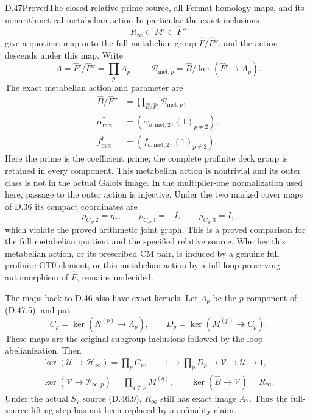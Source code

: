 \begin{statement}{D.47}{Proved}{The closed relative-prime source, all Fermat homology maps, and its nonarithmetical metabelian action}
In particular the exact inclusions
\[
                    R_\infty\subset M'
                                     \subset\widehat F''      \tag{D.47.9}
\]
give a quotient map onto the full metabelian group
\(\widehat F/\widehat F''\), and the action descends
under this map. Write
\[
 A=\widehat F'/\widehat F''=\prod_pA_p,\qquad
 \mathcal B_{\mathrm{met},p}
       =\widehat B/\ker(\widehat F'\to A_p).
\]
The exact metabelian action and parameter are
\[
 \begin{aligned}
 \widehat B/\widehat F''
       &=\prod_{\widehat B/\widehat F'}
                                      \mathcal B_{\mathrm{met},p},\\
 \alpha_{\mathrm{met}}^\dagger
       &=(\alpha_{h,\mathrm{met},2},
                                (1)_{p\ne2}),\\
 f_{\mathrm{met}}^\dagger
       &=(f_{h,\mathrm{met},2},(1)_{p\ne2}).
 \end{aligned}                                                   \tag{D.47.10}
\]
Here the prime is the coefficient prime; the complete
profinite deck group is retained in every component.
This metabelian action is nontrivial and its outer
class is not in the actual Galois image. In the
multiplier-one normalization used here, passage to
the outer action is injective. Under the two marked cover
maps of D.36 its compact coordinates are
\[
       \rho_{C_3,2}=\eta_*,\qquad
       \rho_{C_3,4}=-I,\qquad
       \rho_{C_4,3}=I,                                        \tag{D.47.11}
\]
which violate the proved arithmetic joint graph.
This is a proved comparison for the full metabelian
quotient and the specified relative source. Whether
this metabelian action, or its prescribed CM pair,
is induced by a genuine full profinite GT0 element,
or this metabelian action by a full loop-preserving
automorphism of \(\widehat F\), remains undecided.

The maps back to D.46 also have exact kernels.
Let \(\Lambda_p\) be the \(p\)-component of (D.47.5), and put
\[
 C_p=\ker(N^{(p)}\to\Lambda_p),\qquad
 D_p=\ker(M^{(p)}\twoheadrightarrow C_p).
                                                               \tag{D.47.12}
\]
These maps are the original subgroup inclusions
followed by the loop abelianization. Then
\[
 \begin{gathered}
 \ker(\mathcal U\to\mathcal H_\infty)=\prod_pC_p,\qquad
 1\longrightarrow\prod_pD_p\longrightarrow\mathcal V
                    \longrightarrow\mathcal U\longrightarrow1,\\
 \ker(\mathcal V\to\mathcal P_{\infty,p})
                         =\prod_{q\ne p}M^{(q)},\qquad
 \ker(\widehat B\to\mathcal V)=R_\infty .
 \end{gathered}                                               \tag{D.47.13}
\]
Under the actual \(S_7\) source (D.46.9), \(R_\infty\)
still has exact image \(A_7\). Thus the full-source
lifting step has not been replaced by a cofinality claim.


\end{statement}
